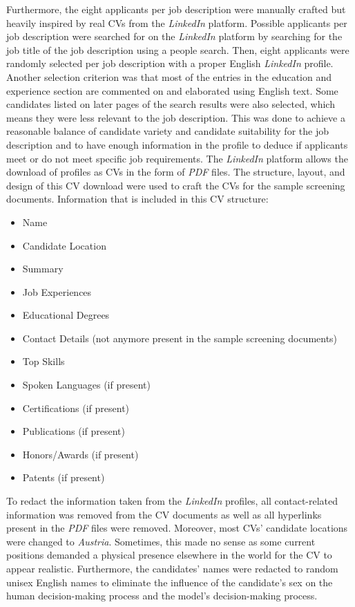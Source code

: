 \documentclass[draft,final]{thesisclass} %
\begin{document}
Furthermore, the eight applicants per job description were manually crafted but heavily inspired by real \acs{CV}s from the \textit{LinkedIn} platform.
Possible applicants per job description were searched for on the \textit{LinkedIn} platform by searching for the job title of the job description using a people search.
Then, eight applicants were randomly selected per job description with a proper English \textit{LinkedIn} profile. Another selection criterion was that most of the entries in the education and experience section are commented on and elaborated using English text.
Some candidates listed on later pages of the search results were also selected, which means they were less relevant to the job description.
This was done to achieve a reasonable balance of candidate variety and candidate suitability for the job description and to have enough information in the profile to deduce if applicants meet or do not meet specific job requirements.
The \textit{LinkedIn} platform allows the download of profiles as \acs{CV}s in the form of \textit{PDF} files.
The structure, layout, and design of this \acs{CV} download were used to craft the \acs{CV}s for the sample screening documents.
Information that is included in this \acs{CV} structure: \label{cv_structure}
\begin{itemize}
    \item Name
    \item Candidate Location
    \item Summary
    \item Job Experiences
    \item Educational Degrees
    \item Contact Details (not anymore present in the sample screening documents)
    \item Top Skills
    \item Spoken Languages (if present)
    \item Certifications (if present)
    \item Publications (if present)
    \item Honors/Awards (if present)
    \item Patents (if present)
\end{itemize}
To redact the information taken from the \textit{LinkedIn} profiles, all contact-related information was removed from the \acs{CV} documents as well as all hyperlinks present in the \textit{PDF} files were removed.
Moreover, most \acs{CV}s' candidate locations were changed to \textit{Austria}. Sometimes, this made no sense as some current positions demanded a physical presence elsewhere in the world for the \acs{CV} to appear realistic.
Furthermore, the candidates' names were redacted to random unisex English names to eliminate the influence of the candidate's sex on the human decision-making process and the model's decision-making process.
\end{document}
